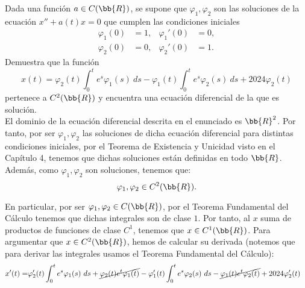 \documentclass[12pt]{article}
\begin{document}
    \begin{ejercicio}
        Dada una función $a \in C(\bb{R})$, se supone que $\varphi_1, \varphi_2$ son las soluciones de la ecuación $x'' + a(t)x = 0$ que cumplen las condiciones iniciales
        \begin{align*}
            \varphi_1(0) &= 1, & \varphi_1'(0) &= 0,\\
            \varphi_2(0) &= 0, & \varphi_2'(0) &= 1.
        \end{align*}
        Demuestra que la función
        \begin{equation*}
            x(t) = \varphi_2(t) \int_0^t e^{s}\varphi_1(s)~ds - \varphi_1(t) \int_0^t e^{s}\varphi_2(s)~ds + 2024\varphi_2(t)
        \end{equation*}
        pertenece a $C^2(\bb{R})$ y encuentra una ecuación diferencial de la que es solución.\\

        El dominio de la ecuación diferencial descrita en el enunciado es $\bb{R}^2$.
        Por tanto, por ser $\varphi_1,\varphi_2$ las soluciones de dicha ecuación diferencial para distintas condiciones iniciales, por el Teorema de Existencia y Unicidad visto en el Capítulo 4, tenemos que dichas soluciones están definidas en todo $\bb{R}$. Además, como $\varphi_1,\varphi_2$ son soluciones, tenemos que:
        \begin{equation*}
            \varphi_1,\varphi_2\in C^2(\bb{R}).
        \end{equation*}

        En particular, por ser $\varphi_1,\varphi_2\in C(\bb{R})$, por el Teorema Fundamental del Cálculo tenemos que dichas integrales son de clase $1$. Por tanto, al $x$ suma de productos de funciones de clase $C^1$, tenemos que $x\in C^1(\bb{R})$. Para argumentar que $x\in C^2(\bb{R})$, hemos de calcular su derivada (notemos que para derivar las integrales usamos el Teorema Fundamental del Cálculo):
        \begin{align*}
            x'(t)=&\varphi_2'(t)\int_0^t e^{s}\varphi_1(s)~ds+\cancel{\varphi_2(t)e^{t}\varphi_1(t)}-\varphi_1'(t)\int_0^t e^{s}\varphi_2(s)~ds-\cancel{\varphi_1(t)e^{t}\varphi_2(t)}+2024\varphi_2'(t)
        \end{align*}


\end{ejercicio}
\end{document}

